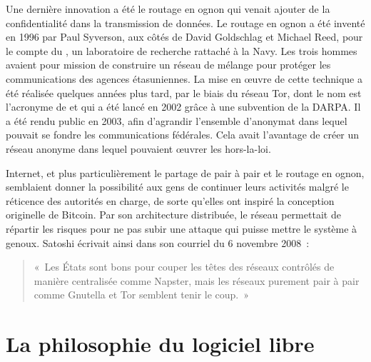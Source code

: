 Une dernière innovation a été le routage en ognon qui venait ajouter de la confidentialité dans la transmission de données. Le routage en ognon a été inventé en 1996 par Paul Syverson, aux côtés de David Goldschlag et Michael Reed, pour le compte du , un laboratoire de recherche rattaché à la Navy. Les trois hommes avaient pour mission de construire un réseau de mélange pour protéger les communications des agences étasuniennes. La mise en œuvre de cette technique a été réalisée quelques années plus tard, par le biais du réseau Tor, dont le nom est l'acronyme de  et qui a été lancé en 2002 grâce à une subvention de la DARPA. Il a été rendu public en 2003, afin d'agrandir l'ensemble d'anonymat dans lequel pouvait se fondre les communications fédérales. Cela avait l'avantage de créer un réseau anonyme dans lequel pouvaient œuvrer les hors-la-loi.

Internet, et plus particulièrement le partage de pair à pair et le routage en ognon, semblaient donner la possibilité aux gens de continuer leurs activités malgré le réticence des autorités en charge, de sorte qu'elles ont inspiré la conception originelle de Bitcoin. Par son architecture distribuée, le réseau permettait de répartir les risques pour ne pas subir une attaque qui puisse mettre le système à genoux. Satoshi écrivait ainsi dans son courriel du 6 novembre 2008~:

\begin{quote}
«~Les États sont bons pour couper les têtes des réseaux contrôlés de manière centralisée comme Napster, mais les réseaux purement pair à pair comme Gnutella et Tor semblent tenir le coup.~»
\end{quote} %


\section*{La philosophie du logiciel libre} %

